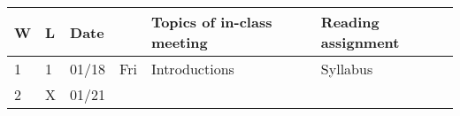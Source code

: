 \begin{longtable}[]{@{}llllll@{}}
\toprule
\begin{minipage}[b]{0.03\columnwidth}\raggedright
W\strut
\end{minipage} & \begin{minipage}[b]{0.03\columnwidth}\raggedright
L\strut
\end{minipage} & \begin{minipage}[b]{0.06\columnwidth}\raggedright
Date\strut
\end{minipage} & \begin{minipage}[b]{0.04\columnwidth}\raggedright
\strut
\end{minipage} & \begin{minipage}[b]{0.49\columnwidth}\raggedright
Topics of in-class meeting\strut
\end{minipage} & \begin{minipage}[b]{0.17\columnwidth}\raggedright
Reading assignment\strut
\end{minipage}\tabularnewline
\midrule
\endhead
\begin{minipage}[t]{0.03\columnwidth}\raggedright
1\strut
\end{minipage} & \begin{minipage}[t]{0.03\columnwidth}\raggedright
1\strut
\end{minipage} & \begin{minipage}[t]{0.06\columnwidth}\raggedright
01/18\strut
\end{minipage} & \begin{minipage}[t]{0.04\columnwidth}\raggedright
Fri\strut
\end{minipage} & \begin{minipage}[t]{0.49\columnwidth}\raggedright
Introductions\strut
\end{minipage} & \begin{minipage}[t]{0.17\columnwidth}\raggedright
Syllabus\strut
\end{minipage}\tabularnewline
\begin{minipage}[t]{0.03\columnwidth}\raggedright
2\strut
\end{minipage} & \begin{minipage}[t]{0.03\columnwidth}\raggedright
X\strut
\end{minipage} & \begin{minipage}[t]{0.06\columnwidth}\raggedright
01/21\strut
\end{minipage} & \begin{minipage}[t]{0.04\columnwidth}\raggedright

\end{minipage}
\end{longtable}
